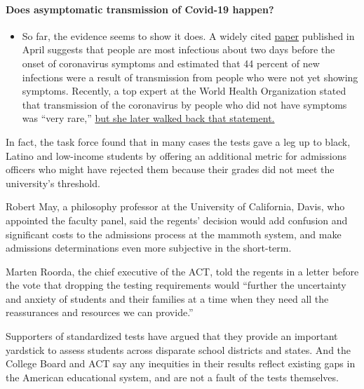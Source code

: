 \begin{itemize}
{  \paragraph{Does asymptomatic transmission of Covid-19
  happen?}\label{does-asymptomatic-transmission-of-covid-19-happen}}

  \begin{itemize}
  \tightlist
  \item
    So far, the evidence seems to show it does. A widely cited
    \href{https://www.nature.com/articles/s41591-020-0869-5}{paper}
    published in April suggests that people are most infectious about
    two days before the onset of coronavirus symptoms and estimated that
    44 percent of new infections were a result of transmission from
    people who were not yet showing symptoms. Recently, a top expert at
    the World Health Organization stated that transmission of the
    coronavirus by people who did not have symptoms was ``very rare,''
    \href{https://www.nytimes.com/2020/06/09/world/coronavirus-updates.html?action=click\&pgtype=Article\&state=default\&region=MAIN_CONTENT_3\&context=storylines_faq\#link-1f302e21}{but
    she later walked back that statement.}
  \end{itemize}
\end{itemize}

In fact, the task force found that in many cases the tests gave a leg up
to black, Latino and low-income students by offering an additional
metric for admissions officers who might have rejected them because
their grades did not meet the university's threshold.

Robert May, a philosophy professor at the University of California,
Davis, who appointed the faculty panel, said the regents' decision would
add confusion and significant costs to the admissions process at the
mammoth system, and make admissions determinations even more subjective
in the short-term.

Marten Roorda, the chief executive of the ACT, told the regents in a
letter before the vote that dropping the testing requirements would
``further the uncertainty and anxiety of students and their families at
a time when they need all the reassurances and resources we can
provide.''

Supporters of standardized tests have argued that they provide an
important yardstick to assess students across disparate school districts
and states. And the College Board and ACT say any inequities in their
results reflect existing gaps in the American educational system, and
are not a fault of the tests themselves.

